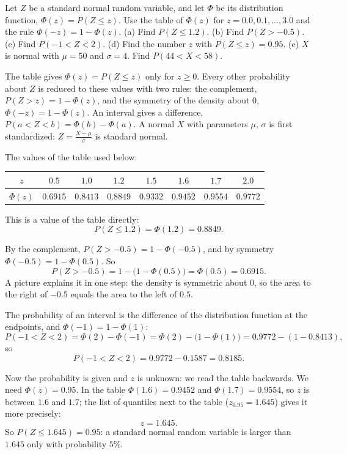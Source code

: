 
\begin{problem}
	Let $Z$ be a standard normal random variable, and let $\Phi$ be its
	distribution function, $\Phi(z)=P(Z\le z)$. Use the table of $\Phi(z)$
	for $z=0.0,0.1,\dots,3.0$ and the rule $\Phi(-z)=1-\Phi(z)$.
	(a) Find $P(Z\le1.2)$.
	(b) Find $P(Z>-0.5)$.
	(c) Find $P(-1<Z<2)$.
	(d) Find the number $z$ with $P(Z\le z)=0.95$.
	(e) $X$ is normal with $\mu=50$ and $\sigma=4$. Find $P(44<X<58)$.
\end{problem}

\begin{solution}
	\idea The table gives $\Phi(z)=P(Z\le z)$ only for $z\ge0$. Every other
	probability about $Z$ is reduced to these values with two rules: the
	complement, $P(Z>z)=1-\Phi(z)$, and the symmetry of the density about
	$0$, $\Phi(-z)=1-\Phi(z)$. An interval gives a difference,
	$P(a<Z<b)=\Phi(b)-\Phi(a)$. A normal $X$ with parameters $\mu$, $\sigma$
	is first standardized: $Z=\frac{X-\mu}{\sigma}$ is standard normal.

	The values of the table used below:
	\begin{center}
		\begin{tabular}{c|ccccccc}
			$z$       & $0.5$    & $1.0$    & $1.2$    & $1.5$    & $1.6$    & $1.7$    & $2.0$    \\
			\hline
			$\Phi(z)$ & $0.6915$ & $0.8413$ & $0.8849$ & $0.9332$ & $0.9452$ & $0.9554$ & $0.9772$
		\end{tabular}
	\end{center}

	 This is a value of the table directly:
	\[ P(Z\le1.2)=\Phi(1.2)=0.8849. \]

	 By the complement, $P(Z>-0.5)=1-\Phi(-0.5)$, and by symmetry
	$\Phi(-0.5)=1-\Phi(0.5)$. So
	\[ P(Z>-0.5)=1-\bigl(1-\Phi(0.5)\bigr)=\Phi(0.5)=0.6915. \]
	A picture explains it in one step: the density is symmetric about $0$,
	so the area to the right of $-0.5$ equals the area to the left of $0.5$.

	 The probability of an interval is the difference of the
	distribution function at the endpoints, and $\Phi(-1)=1-\Phi(1)$:
	\[ P(-1<Z<2)=\Phi(2)-\Phi(-1)=\Phi(2)-\bigl(1-\Phi(1)\bigr)
		=0.9772-(1-0.8413), \]
	so
	\[ P(-1<Z<2)=0.9772-0.1587=0.8185. \]

	 Now the probability is given and $z$ is unknown: we read the
	table backwards. We need $\Phi(z)=0.95$. In the table
	$\Phi(1.6)=0.9452$ and $\Phi(1.7)=0.9554$, so $z$ is between $1.6$ and
	$1.7$; the list of quantiles next to the table ($z_{0.95}=1.645$) gives
	it more precisely:
	\[ z=1.645. \]
	So $P(Z\le1.645)=0.95$: a standard normal random variable is larger than
	$1.645$ only with probability $5\%$.


\end{solution}
